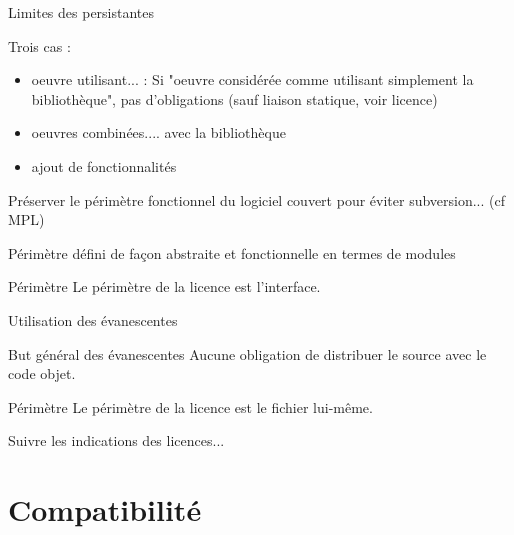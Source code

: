 \documentclass{beamer}
\begin{document}

\begin{frame}{Limites des persistantes}

Trois cas :

  \begin{itemize}
  \item oeuvre utilisant... : Si "oeuvre considérée comme utilisant simplement la bibliothèque", pas
    d'obligations (sauf liaison statique, voir licence)
  \item oeuvres combinées.... avec la bibliothèque
  \item ajout de fonctionnalités
  \end{itemize}

Préserver le périmètre fonctionnel du logiciel couvert pour éviter subversion... (cf MPL)

Périmètre défini de façon abstraite et fonctionnelle en termes de modules

 \begin{alertblock}{Périmètre}
    Le périmètre de la licence est l'interface.
  \end{alertblock}
  
\end{frame}

\begin{frame}{Utilisation des évanescentes}

  \begin{block}{But général des évanescentes}
    Aucune obligation de distribuer le source avec le code objet.
  \end{block}

  \begin{alertblock}{Périmètre}
    Le périmètre de la licence est le fichier lui-même.
  \end{alertblock}

  Suivre les indications des licences...

\end{frame}

\section{Compatibilité}
\end{document}
